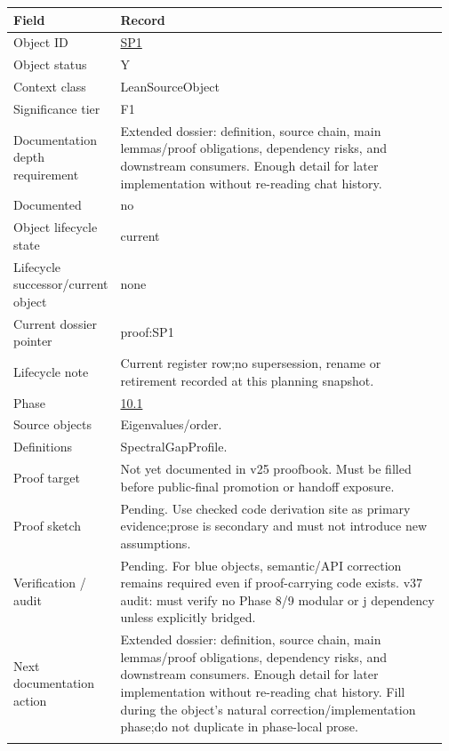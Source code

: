 \begin{longtable}{L{0.16\linewidth} L{0.81\linewidth}}
\hline
\textbf{Field} & \textbf{Record}\\
\hline
Object ID & \hyperlink{object-row-SP1}{SP1}\\
\hline\addlinespace[0.20em]
Object status & Y\\
\hline\addlinespace[0.20em]
Context class & LeanSourceObject\\
\hline\addlinespace[0.20em]
Significance tier & F1\\
\hline\addlinespace[0.20em]
Documentation depth requirement & Extended dossier: definition, source chain, main lemmas/\allowbreak{}proof obligations, dependency risks, and downstream consumers. Enough detail for later implementation without re-reading chat history.\\
\hline\addlinespace[0.20em]
Documented & no\\
\hline\addlinespace[0.20em]
Object lifecycle state & current\\
\hline\addlinespace[0.20em]
Lifecycle successor/\allowbreak{}current object & none\\
\hline\addlinespace[0.20em]
Current dossier pointer & proof:SP1\\
\hline\addlinespace[0.20em]
Lifecycle note & Current register row;\newline no supersession, rename or retirement recorded at this planning snapshot.\\
\hline\addlinespace[0.20em]
Phase & \hyperlink{phase-row-10-1}{10.1}\\
\hline\addlinespace[0.20em]
Source objects & Eigenvalues/\allowbreak{}order.\\
\hline\addlinespace[0.20em]
Definitions & SpectralGapProfile.\\
\hline\addlinespace[0.20em]
Proof target & Not yet documented in v25 proofbook. Must be filled before public-final promotion or handoff exposure.\\
\hline\addlinespace[0.20em]
Proof sketch & Pending. Use checked code derivation site as primary evidence;\newline prose is secondary and must not introduce new assumptions.\\
\hline\addlinespace[0.20em]
Verification /\allowbreak{} audit & Pending. For blue objects, semantic/\allowbreak{}API correction remains required even if proof-carrying code exists. v37 audit: must verify no Phase 8/\allowbreak{}9 modular or j dependency unless explicitly bridged.\\
\hline\addlinespace[0.20em]
Next documentation action & Extended dossier: definition, source chain, main lemmas/\allowbreak{}proof obligations, dependency risks, and downstream consumers. Enough detail for later implementation without re-reading chat history. Fill during the object's natural correction/\allowbreak{}implementation phase;\newline do not duplicate in phase-local prose.\\
\hline\addlinespace[0.20em]
\end{longtable}
